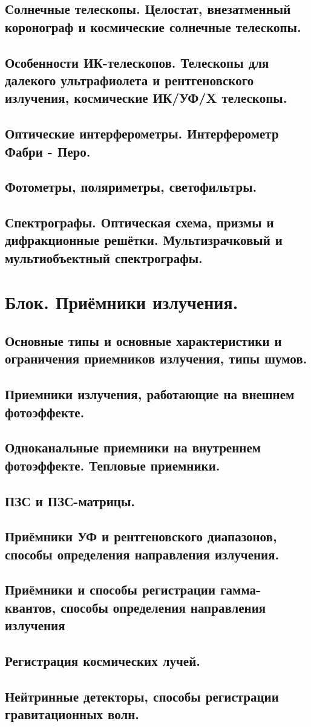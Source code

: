 \documentclass[12pt]{article}
\begin{document}
	\subsection{Солнечные телескопы. Целостат, внезатменный коронограф и космические солнечные телескопы.}
	\subsection{Особенности ИК-телескопов. Телескопы для далекого ультрафиолета и рентгеновского излучения, космические ИК/УФ/X телескопы.}
	\subsection{Оптические интерферометры. Интерферометр Фабри - Перо.}
	\subsection{Фотометры, поляриметры, светофильтры.}
	\subsection{Спектрографы. Оптическая схема, призмы и дифракционные решётки. Мультизрачковый и мультиобъектный спектрографы.}
	\section{Блок. Приёмники излучения.}
\subsection{Основные типы и основные характеристики и ограничения приемников излучения, типы шумов.}
\subsection{Приемники излучения, работающие на внешнем фотоэффекте.}
\subsection{Одноканальные приемники на внутреннем фотоэффекте. Тепловые приемники.}
\subsection{ПЗС и ПЗС-матрицы.}
\subsection{Приёмники УФ и рентгеновского диапазонов, способы определения направления излучения.}
\subsection{Приёмники и способы регистрации гамма-квантов, способы определения направления излучения}
\subsection{Регистрация космических лучей.}
\subsection{Нейтринные детекторы, способы регистрации гравитационных волн.}
	
\end{document}
